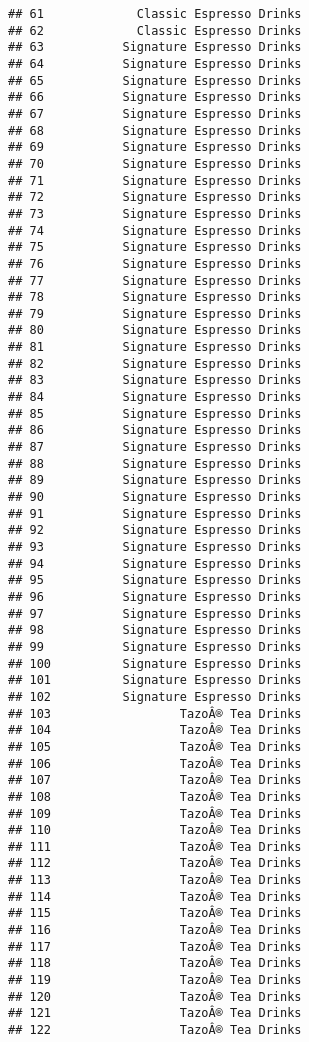 \documentclass[
]{article}
\begin{document}
\begin{verbatim}
## 61             Classic Espresso Drinks
## 62             Classic Espresso Drinks
## 63           Signature Espresso Drinks
## 64           Signature Espresso Drinks
## 65           Signature Espresso Drinks
## 66           Signature Espresso Drinks
## 67           Signature Espresso Drinks
## 68           Signature Espresso Drinks
## 69           Signature Espresso Drinks
## 70           Signature Espresso Drinks
## 71           Signature Espresso Drinks
## 72           Signature Espresso Drinks
## 73           Signature Espresso Drinks
## 74           Signature Espresso Drinks
## 75           Signature Espresso Drinks
## 76           Signature Espresso Drinks
## 77           Signature Espresso Drinks
## 78           Signature Espresso Drinks
## 79           Signature Espresso Drinks
## 80           Signature Espresso Drinks
## 81           Signature Espresso Drinks
## 82           Signature Espresso Drinks
## 83           Signature Espresso Drinks
## 84           Signature Espresso Drinks
## 85           Signature Espresso Drinks
## 86           Signature Espresso Drinks
## 87           Signature Espresso Drinks
## 88           Signature Espresso Drinks
## 89           Signature Espresso Drinks
## 90           Signature Espresso Drinks
## 91           Signature Espresso Drinks
## 92           Signature Espresso Drinks
## 93           Signature Espresso Drinks
## 94           Signature Espresso Drinks
## 95           Signature Espresso Drinks
## 96           Signature Espresso Drinks
## 97           Signature Espresso Drinks
## 98           Signature Espresso Drinks
## 99           Signature Espresso Drinks
## 100          Signature Espresso Drinks
## 101          Signature Espresso Drinks
## 102          Signature Espresso Drinks
## 103                  TazoÂ® Tea Drinks
## 104                  TazoÂ® Tea Drinks
## 105                  TazoÂ® Tea Drinks
## 106                  TazoÂ® Tea Drinks
## 107                  TazoÂ® Tea Drinks
## 108                  TazoÂ® Tea Drinks
## 109                  TazoÂ® Tea Drinks
## 110                  TazoÂ® Tea Drinks
## 111                  TazoÂ® Tea Drinks
## 112                  TazoÂ® Tea Drinks
## 113                  TazoÂ® Tea Drinks
## 114                  TazoÂ® Tea Drinks
## 115                  TazoÂ® Tea Drinks
## 116                  TazoÂ® Tea Drinks
## 117                  TazoÂ® Tea Drinks
## 118                  TazoÂ® Tea Drinks
## 119                  TazoÂ® Tea Drinks
## 120                  TazoÂ® Tea Drinks
## 121                  TazoÂ® Tea Drinks
## 122                  TazoÂ® Tea Drinks

\end{verbatim}
\end{document}
